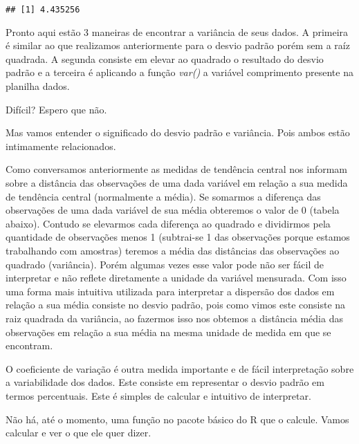 \documentclass[]{book}
\newenvironment{Shaded}{\begin{snugshade}}{\end{snugshade}}
\newcommand{\DecValTok}[1]{\textcolor[rgb]{0.00,0.00,0.81}{#1}}
\newcommand{\KeywordTok}[1]{\textcolor[rgb]{0.13,0.29,0.53}{\textbf{#1}}}
\newcommand{\NormalTok}[1]{#1}
\newcommand{\OperatorTok}[1]{\textcolor[rgb]{0.81,0.36,0.00}{\textbf{#1}}}
\begin{document}
\begin{verbatim}
## [1] 4.435256
\end{verbatim}

Pronto aqui estão 3 maneiras de encontrar a variância de seus dados. A primeira é similar ao que realizamos anteriormente para o desvio padrão porém sem a raíz quadrada. A segunda consiste em elevar ao quadrado o resultado do desvio padrão e a terceira é aplicando a função \emph{var()} a variável comprimento presente na planilha dados.

Difícil? Espero que não.

Mas vamos entender o significado do desvio padrão e variância. Pois ambos estão intimamente relacionados.

Como conversamos anteriormente as medidas de tendência central nos informam sobre a distância das observações de uma dada variável em relação a sua medida de tendência central (normalmente a média). Se somarmos a diferença das observações de uma dada variável de sua média obteremos o valor de 0 (tabela abaixo). Contudo se elevarmos cada diferença ao quadrado e dividirmos pela quantidade de observações menos 1 (subtrai-se 1 das observações porque estamos trabalhando com amostras) teremos a média das distâncias das observações ao quadrado (variância). Porém algumas vezes esse valor pode não ser fácil de interpretar e não reflete diretamente a unidade da variável mensurada. Com isso uma forma mais intuitiva utilizada para interpretar a dispersão dos dados em relação a sua média consiste no desvio padrão, pois como vimos este consiste na raiz quadrada da variância, ao fazermos isso nos obtemos a distância média das observações em relação a sua média na mesma unidade de medida em que se encontram.

O coeficiente de variação é outra medida importante e de fácil interpretação sobre a variabilidade dos dados. Este consiste em representar o desvio padrão em termos percentuais. Este é simples de calcular e intuitivo de interpretar.

Não há, até o momento, uma função no pacote básico do R que o calcule. Vamos calcular e ver o que ele quer dizer.

\begin{Shaded}
\end{Shaded}
\end{document}
